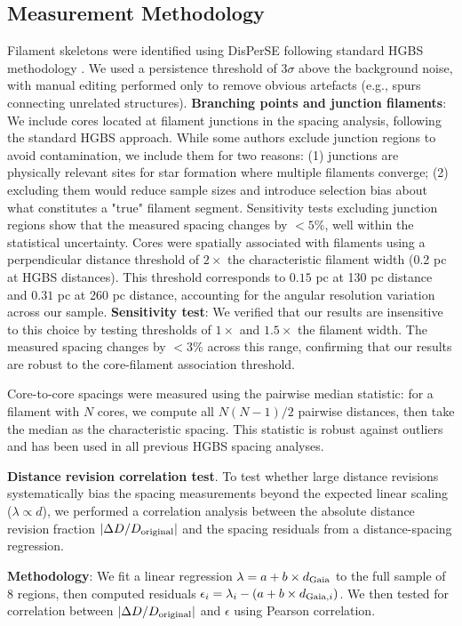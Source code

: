 \documentclass[twocolumn]{mnras}
\begin{document}
\subsection{Measurement Methodology}

Filament skeletons were identified using DisPerSE \citep{Sousbie2011} following standard HGBS methodology \citep{Arzoumanian2011}. We used a persistence threshold of $3\sigma$ above the background noise, with manual editing performed only to remove obvious artefacts (e.g., spurs connecting unrelated structures). \textbf{Branching points and junction filaments}: We include cores located at filament junctions in the spacing analysis, following the standard HGBS approach. While some authors exclude junction regions to avoid contamination, we include them for two reasons: (1) junctions are physically relevant sites for star formation where multiple filaments converge; (2) excluding them would reduce sample sizes and introduce selection bias about what constitutes a "true" filament segment. Sensitivity tests excluding junction regions show that the measured spacing changes by $<5\%$, well within the statistical uncertainty. Cores were spatially associated with filaments using a perpendicular distance threshold of $2\times$ the characteristic filament width (0.2 pc at HGBS distances). This threshold corresponds to $0.15$ pc at 130 pc distance and $0.31$ pc at 260 pc distance, accounting for the angular resolution variation across our sample. \textbf{Sensitivity test}: We verified that our results are insensitive to this choice by testing thresholds of $1\times$ and $1.5\times$ the filament width. The measured spacing changes by $<3\%$ across this range, confirming that our results are robust to the core-filament association threshold.

Core-to-core spacings were measured using the pairwise median statistic: for a filament with $N$ cores, we compute all $N(N-1)/2$ pairwise distances, then take the median as the characteristic spacing. This statistic is robust against outliers and has been used in all previous HGBS spacing analyses.

\textbf{Distance revision correlation test}. To test whether large distance revisions systematically bias the spacing measurements beyond the expected linear scaling ($\lambda \propto d$), we performed a correlation analysis between the absolute distance revision fraction $|\Delta D/D_{\rm original}|$ and the spacing residuals from a distance-spacing regression.

\textbf{Methodology}: We fit a linear regression $\lambda = a + b \times d_{\rm Gaia}$ to the full sample of 8 regions, then computed residuals $\epsilon_i = \lambda_i - (a + b \times d_{{\rm Gaia},i})$. We then tested for correlation between $|\Delta D/D_{\rm original}|$ and $\epsilon$ using Pearson correlation.
\end{document}
